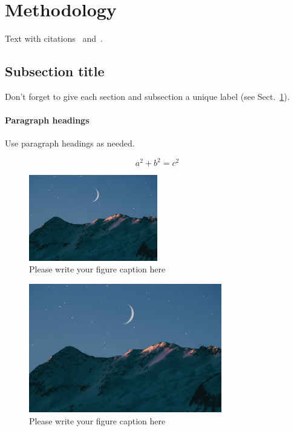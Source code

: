 
\section{Methodology}\label{sec:methodology}
Text with citations~\cite{Tartarini2020a} and~\cite{Tartarini2020}.

\subsection{Subsection title}\label{subsec:2}
Don't forget to give each section
and subsection a unique label (see Sect.~\ref{sec:methodology}).

\paragraph{Paragraph headings} Use paragraph headings as needed.

\begin{equation}
a^2+b^2=c^2\label{eq:equation}
\end{equation}

\begin{figure}
  \centering
  \includegraphics[width=0.5\textwidth]{figures/moon}
  \caption{Please write your figure caption here}
  \label{fig:1}       %
\end{figure}

\begin{figure}
  \centering
  \includegraphics[width=0.75\textwidth]{figures/moon}
  \caption{Please write your figure caption here}
  \label{fig:2}       %
\end{figure}

